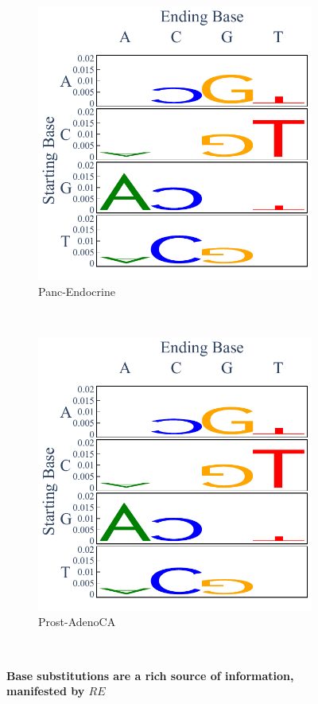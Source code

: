 \begin{figure}[ht!]
    \begin{subfigure}{.5\textwidth}
    \centering
    \includegraphics[scale=0.5]{graphics/spectra_Panc-Endocrine.pdf}
    \caption{Panc-Endocrine}
    \end{subfigure} 
    ~
    \begin{subfigure}{.5\textwidth}
    \centering
    \includegraphics[scale=0.5]{graphics/spectra_Prost-AdenoCA.pdf}
    \caption{Prost-AdenoCA}
    \end{subfigure} \\

    \caption{\textbf{Base substitutions are a rich source of information, manifested by $RE$}}
    \label{fig:apdx_spectra}
\end{figure}
